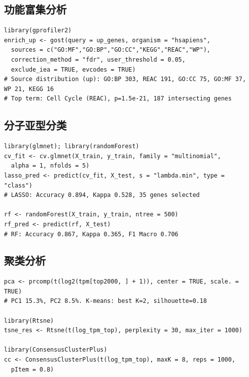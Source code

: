 \documentclass[12pt,a4paper]{ctexart}
\begin{document}
\subsection{功能富集分析}
\begin{lstlisting}[caption={g:Profiler功能富集}, basicstyle=\ttfamily\scriptsize]
library(gprofiler2)
enrich_up <- gost(query = up_genes, organism = "hsapiens",
  sources = c("GO:MF","GO:BP","GO:CC","KEGG","REAC","WP"),
  correction_method = "fdr", user_threshold = 0.05,
  exclude_iea = TRUE, evcodes = TRUE)
# Source distribution (up): GO:BP 303, REAC 191, GO:CC 75, GO:MF 37, WP 21, KEGG 16
# Top term: Cell Cycle (REAC), p=1.5e-21, 187 intersecting genes
\end{lstlisting}

\subsection{分子亚型分类}
\begin{lstlisting}[caption={LASSO与随机森林分类}, basicstyle=\ttfamily\scriptsize]
library(glmnet); library(randomForest)
cv_fit <- cv.glmnet(X_train, y_train, family = "multinomial",
  alpha = 1, nfolds = 5)
lasso_pred <- predict(cv_fit, X_test, s = "lambda.min", type = "class")
# LASSO: Accuracy 0.894, Kappa 0.528, 35 genes selected

rf <- randomForest(X_train, y_train, ntree = 500)
rf_pred <- predict(rf, X_test)
# RF: Accuracy 0.867, Kappa 0.365, F1 Macro 0.706
\end{lstlisting}

\subsection{聚类分析}
\begin{lstlisting}[caption={PCA/t-SNE/K-means/共识聚类}, basicstyle=\ttfamily\scriptsize]
pca <- prcomp(t(log2(tpm[top2000, ] + 1)), center = TRUE, scale. = TRUE)
# PC1 15.3%, PC2 8.5%. K-means: best K=2, silhouette=0.18

library(Rtsne)
tsne_res <- Rtsne(t(log_tpm_top), perplexity = 30, max_iter = 1000)

library(ConsensusClusterPlus)
cc <- ConsensusClusterPlus(t(log_tpm_top), maxK = 8, reps = 1000,
  pItem = 0.8)
\end{lstlisting}
\end{document}
